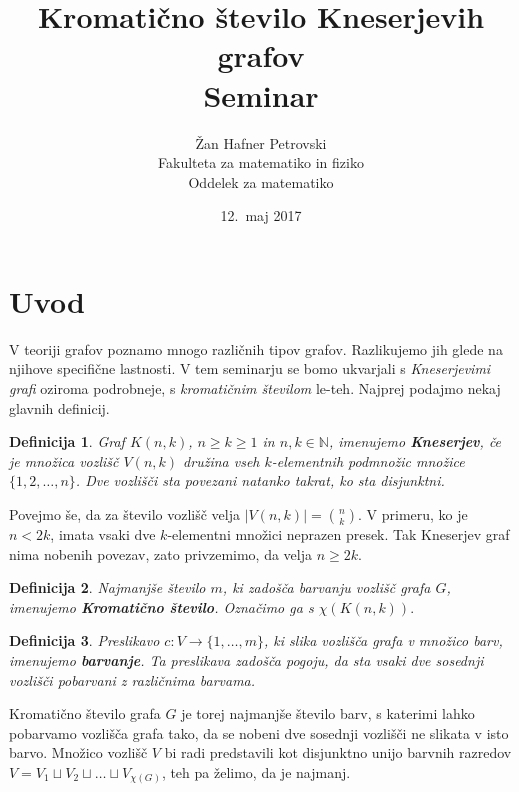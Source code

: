 \documentclass[a4paper,12pt]{article}
\title{Kromatično število Kneserjevih grafov \\ 
\Large Seminar}
\author{Žan Hafner Petrovski \\
Fakulteta za matematiko in fiziko \\
Oddelek za matematiko}
\date{12.\ maj 2017}
\newtheorem{definicija}{Definicija}
\begin{document}
 
\maketitle


\section{Uvod}

V teoriji grafov poznamo mnogo različnih tipov grafov. Razlikujemo jih glede na njihove specifične lastnosti. V tem seminarju se bomo ukvarjali s {\em Kneserjevimi grafi} oziroma podrobneje, s {\em kromatičnim številom} le-teh. Najprej podajmo nekaj glavnih definicij.


\begin{definicija}
Graf $K(n,k)$, $n \geq k \geq 1$ in $n, k \in \mathbb{N}$, imenujemo \mbox{\textbf{Kneserjev}}, če je množica vozlišč $V(n,k)$ družina vseh $k$-elementnih podmnožic množice $\{1, 2, \ldots, n\}$. Dve vozlišči sta povezani natanko takrat, ko sta disjunktni. 
\end{definicija}

Povejmo še, da za število vozlišč velja $|V(n,k)|={{n}\choose{k}}$. V primeru, ko je $n < 2k$, imata vsaki dve $k$-elementni množici neprazen presek. Tak Kneserjev graf nima nobenih povezav, zato privzemimo, da velja $n \geq 2k$.


\begin{definicija}
Najmanjše število $m$, ki zadošča barvanju vozlišč grafa $G$, imenujemo \textbf {Kromatično število}. Označimo ga s $\chi(K(n,k)).$
\end{definicija}

\begin{definicija}
Preslikavo $c: V \rightarrow \{1, \ldots, m\}$, ki slika vozlišča grafa v množico barv, imenujemo \textbf {barvanje}. Ta preslikava zadošča pogoju, da sta vsaki dve sosednji vozlišči pobarvani z različnima barvama.
\end{definicija}

Kromatično število grafa $G$ je torej najmanjše število barv, s katerimi lahko pobarvamo vozlišča grafa tako, da se nobeni dve sosednji vozlišči ne slikata v isto barvo. Množico vozlišč $V$ bi radi predstavili kot disjunktno unijo barvnih razredov $V = V_1 \sqcup V_2 \sqcup \ldots \sqcup V_{\chi(G)}$, teh pa želimo, da je najmanj. 
\end{document}
